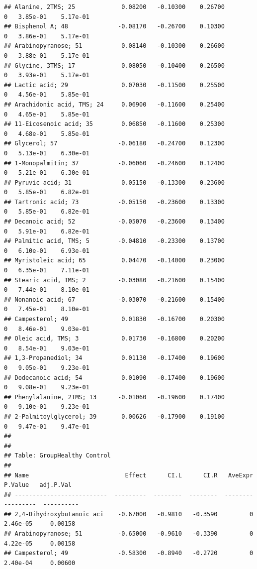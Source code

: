 \documentclass[]{article}
\begin{document}
\begin{verbatim}
## Alanine, 2TMS; 25             0.08200   -0.10300    0.26700         0   3.85e-01    5.17e-01
## Bisphenol A; 48              -0.08170   -0.26700    0.10300         0   3.86e-01    5.17e-01
## Arabinopyranose; 51           0.08140   -0.10300    0.26600         0   3.88e-01    5.17e-01
## Glycine, 3TMS; 17             0.08050   -0.10400    0.26500         0   3.93e-01    5.17e-01
## Lactic acid; 29               0.07030   -0.11500    0.25500         0   4.56e-01    5.85e-01
## Arachidonic acid, TMS; 24     0.06900   -0.11600    0.25400         0   4.65e-01    5.85e-01
## 11-Eicosenoic acid; 35        0.06850   -0.11600    0.25300         0   4.68e-01    5.85e-01
## Glycerol; 57                 -0.06180   -0.24700    0.12300         0   5.13e-01    6.30e-01
## 1-Monopalmitin; 37           -0.06060   -0.24600    0.12400         0   5.21e-01    6.30e-01
## Pyruvic acid; 31              0.05150   -0.13300    0.23600         0   5.85e-01    6.82e-01
## Tartronic acid; 73           -0.05150   -0.23600    0.13300         0   5.85e-01    6.82e-01
## Decanoic acid; 52            -0.05070   -0.23600    0.13400         0   5.91e-01    6.82e-01
## Palmitic acid, TMS; 5        -0.04810   -0.23300    0.13700         0   6.10e-01    6.93e-01
## Myristoleic acid; 65          0.04470   -0.14000    0.23000         0   6.35e-01    7.11e-01
## Stearic acid, TMS; 2         -0.03080   -0.21600    0.15400         0   7.44e-01    8.10e-01
## Nonanoic acid; 67            -0.03070   -0.21600    0.15400         0   7.45e-01    8.10e-01
## Campesterol; 49               0.01830   -0.16700    0.20300         0   8.46e-01    9.03e-01
## Oleic acid, TMS; 3            0.01730   -0.16800    0.20200         0   8.54e-01    9.03e-01
## 1,3-Propanediol; 34           0.01130   -0.17400    0.19600         0   9.05e-01    9.23e-01
## Dodecanoic acid; 54           0.01090   -0.17400    0.19600         0   9.08e-01    9.23e-01
## Phenylalanine, 2TMS; 13      -0.01060   -0.19600    0.17400         0   9.10e-01    9.23e-01
## 2-Palmitoylglycerol; 39       0.00626   -0.17900    0.19100         0   9.47e-01    9.47e-01
## 
## 
## Table: GroupHealthy Control
## 
## Name                           Effect      CI.L      CI.R   AveExpr    P.Value   adj.P.Val
## --------------------------  ---------  --------  --------  --------  ---------  ----------
## 2,4-Dihydroxybutanoic aci    -0.67000   -0.9810   -0.3590         0   2.46e-05     0.00158
## Arabinopyranose; 51          -0.65000   -0.9610   -0.3390         0   4.22e-05     0.00158
## Campesterol; 49              -0.58300   -0.8940   -0.2720         0   2.40e-04     0.00600

\end{verbatim}
\end{document}
